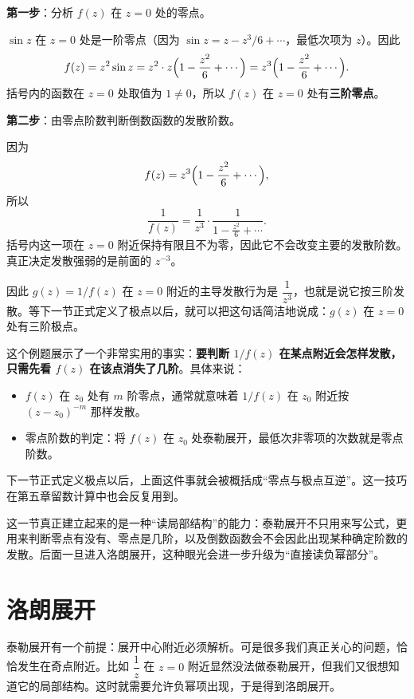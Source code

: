 \begin{jie}
\textbf{第一步}：分析 $f(z)$ 在 $z=0$ 处的零点。

$\sin z$ 在 $z=0$ 处是一阶零点（因为 $\sin z = z - z^3/6 + \cdots$，最低次项为 $z$）。因此
\[
    f(z) = z^2 \sin z = z^2 \cdot z\Bigl(1 - \frac{z^2}{6} + \cdots\Bigr) = z^3\Bigl(1 - \frac{z^2}{6} + \cdots\Bigr).
\]
括号内的函数在 $z=0$ 处取值为 $1\ne 0$，所以 $f(z)$ 在 $z=0$ 处有\textbf{三阶零点}。

\textbf{第二步}：由零点阶数判断倒数函数的发散阶数。

因为
\[
    f(z)=z^3\Bigl(1-\frac{z^2}{6}+\cdots\Bigr),
\]
所以
\[
    \frac{1}{f(z)}
    = \frac{1}{z^3}\cdot \frac{1}{1-\frac{z^2}{6}+\cdots}.
\]
括号内这一项在 $z=0$ 附近保持有限且不为零，因此它不会改变主要的发散阶数。真正决定发散强弱的是前面的 $z^{-3}$。

因此 $g(z)=1/f(z)$ 在 $z=0$ 附近的主导发散行为是 $\dfrac{1}{z^3}$，也就是说它按三阶发散。等下一节正式定义了极点以后，就可以把这句话简洁地说成：$g(z)$ 在 $z=0$ 处有三阶极点。
\end{jie}

\begin{tishi}[零点与倒数函数发散阶数的关系]
这个例题展示了一个非常实用的事实：\textbf{要判断 $1/f(z)$ 在某点附近会怎样发散，只需先看 $f(z)$ 在该点消失了几阶}。具体来说：
\begin{itemize}
    \item $f(z)$ 在 $z_0$ 处有 $m$ 阶零点，通常就意味着 $1/f(z)$ 在 $z_0$ 附近按 $(z-z_0)^{-m}$ 那样发散。
    \item 零点阶数的判定：将 $f(z)$ 在 $z_0$ 处泰勒展开，最低次非零项的次数就是零点阶数。
\end{itemize}
下一节正式定义极点以后，上面这件事就会被概括成``零点与极点互逆''。这一技巧在第五章留数计算中也会反复用到。
\end{tishi}

\begin{tishi}[本节小结]
这一节真正建立起来的是一种``读局部结构''的能力：泰勒展开不只用来写公式，更用来判断零点有没有、零点是几阶，以及倒数函数会不会因此出现某种确定阶数的发散。后面一旦进入洛朗展开，这种眼光会进一步升级为``直接读负幂部分''。
\end{tishi}

\section{洛朗展开}

\begin{wulibj}[为什么泰勒展开还不够]
泰勒展开有一个前提：展开中心附近必须解析。可是很多我们真正关心的问题，恰恰发生在奇点附近。比如 $\dfrac{1}{z}$ 在 $z=0$ 附近显然没法做泰勒展开，但我们又很想知道它的局部结构。这时就需要允许负幂项出现，于是得到洛朗展开。
\end{wulibj}

